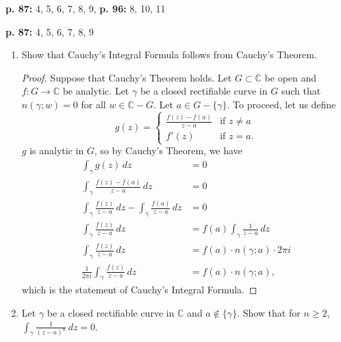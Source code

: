 \documentclass[11pt,oneside,english]{amsart}
\theoremstyle{definition}
\newcommand{\lspace}{\vspace{5mm}}
\newcommand{\MB}[1]{\mathbb{#1}}
\begin{document}
\rightline{\today}

\lspace



\textbf{p. 87:} 4, 5, 6, 7, 8, 9, \textbf{p. 96:} 8, 10, 11

\lspace

\textbf{p. 87:} 4, 5, 6, 7, 8, 9

\begin{enumerate}[leftmargin=*]
\itemsep5mm

\setcounter{enumi}{3}

\item Show that Cauchy's Integral Formula follows from Cauchy's Theorem.

\begin{proof}
Suppose that Cauchy's Theorem holds. Let $G\subset\MB{C}$ be open and $f:G\to\MB{C}$ be analytic. Let $\gamma$ be a closed rectifiable curve in $G$ such that $n(\gamma;w)=0$ for all $w\in\MB{C}-G$. Let $a\in G-\{\gamma\}$. To proceed, let us define
\[
g(z)=\begin{cases}\frac{f(z)-f(a)}{z-a} & \text{if }z\neq a\\ f'(z) & \text{if } z=a.
\end{cases}
\]
$g$ is analytic in $G$, so by Cauchy's Theorem, we have
\begin{align*}
\int_\gamma g(z)\,dz&=0\\[2mm]
\int_\gamma \frac{f(z)-f(a)}{z-a}\,dz&=0\\[2mm]
\int_\gamma\frac{f(z)}{z-a}\,dz-\int_\gamma\frac{f(a)}{z-a}\,dz&=0\\[2mm]
\int_\gamma\frac{f(z)}{z-a}\,dz&=f(a)\int_\gamma\frac{1}{z-a}\,dz\\[2mm]
\int_\gamma\frac{f(z)}{z-a}\,dz&=f(a)\cdot n(\gamma; a)\cdot 2\pi i\\[2mm]
\frac{1}{2\pi i}\int_\gamma\frac{f(z)}{z-a}\,dz&=f(a)\cdot n(\gamma; a),
\end{align*}
which is the statement of Cauchy's Integral Formula.
\end{proof}

\pagebreak


\item Let $\gamma$ be a closed rectifiable curve in $\MB{C}$ and $a\not\in\{\gamma\}$. Show that for $n\geq 2$, $\displaystyle \int_\gamma \frac{1}{(z-a)^n}\,dz=0$.


\end{enumerate}
\end{document}
